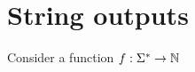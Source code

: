 \section{String outputs}
\label{sec:string-outputs}



\begin{lemma}
    Consider a function $f : \Sigma^* \to {\mathbb N}$ 
\end{lemma}